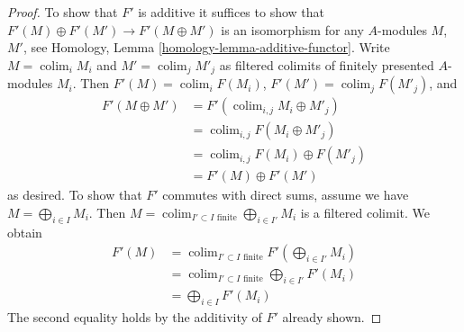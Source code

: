\documentclass[10pt,a4paper]{amsart}
\theoremstyle{plain}
\theoremstyle{definition}
\theoremstyle{remark}
\numberwithin{equation}{subsection}
\def\colim{\mathop{\mathrm{colim}}\nolimits}
\begin{document}
\begin{proof}
To show that $F'$ is additive it suffices to show
that $F'(M) \oplus F'(M') \to F'(M \oplus M')$ is an isomorphism for
any $A$-modules $M$, $M'$, see
Homology, Lemma \ref{homology-lemma-additive-functor}.
Write $M = \colim_i M_i$ and $M' = \colim_j M'_j$ as filtered colimits
of finitely presented $A$-modules $M_i$. Then
$F'(M) = \colim_i F(M_i)$, $F'(M') = \colim_j F(M'_j)$, and
\begin{align*}
F'(M \oplus M')
& =
F'(\colim_{i, j} M_i \oplus M'_j) \\
& =
\colim_{i, j} F(M_i \oplus M'_j) \\
& =
\colim_{i, j} F(M_i) \oplus F(M'_j) \\
& =
F'(M) \oplus F'(M')
\end{align*}
as desired. To show that $F'$ commutes with direct sums, assume
we have $M = \bigoplus_{i \in I} M_i$. Then
$M = \colim_{I' \subset I\text{ finite}} \bigoplus_{i \in I'} M_i$
is a filtered colimit. We obtain
\begin{align*}
F'(M)
& =
\colim_{I' \subset I\text{ finite}}
F'(\bigoplus\nolimits_{i \in I'} M_i) \\
& =
\colim_{I' \subset I\text{ finite}}
\bigoplus\nolimits_{i \in I'} F'(M_i) \\
& =
\bigoplus\nolimits_{i \in I} F'(M_i)
\end{align*}
The second equality holds by the additivity of $F'$ already shown.
\end{proof}
\end{document}
